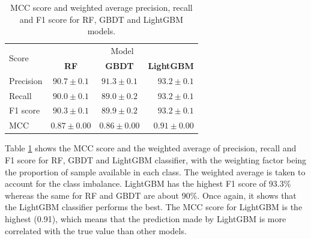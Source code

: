 \documentclass[fleqn,usenatbib]{mnras}
\begin{document}
    \begin{table}
        \centering
         \caption{MCC score and weighted average precision, recall and F1 score for RF, GBDT and LightGBM models.}
        \label{tab:model-comp}
        \begin{tabular}{lccr}
        \hline
        \multirow{2}{*}{Score} & \multicolumn{3}{c}{Model}                           \\ 
                               & \textbf{RF}     & \textbf{GBDT} & \textbf{LightGBM} \\ \hline
        Precision              & $90.7\pm0.1$   & $91.3\pm0.1$         & $93.2\pm0.1$           \\
        Recall                 & $90.0\pm0.1$   & $89.0\pm0.2$          & $93.2\pm0.1$            \\
        F1 score               & $90.3\pm0.1$   & $89.9\pm0.2$          & $93.2\pm0.1$            \\
        MCC                    & $0.87\pm0.00$ & $0.86\pm0.00$         & $0.91\pm0.00$          \\ \hline
        \end{tabular}
    \end{table}
    Table \ref{tab:model-comp} shows the MCC score and the weighted average of precision, recall and F1 score for RF, GBDT and LightGBM classifier, with the weighting factor being the proportion of sample available in each class. The weighted average is taken to account for the class imbalance. LightGBM has the highest F1 score of 93.3\% whereas the same for RF and GBDT are about 90\%. Once again, it shows that the LightGBM classifier performs the best. The MCC score for LightGBM is the highest (0.91), which means that the prediction made by LightGBM is more correlated with the true value than other models.
    
\end{document}
